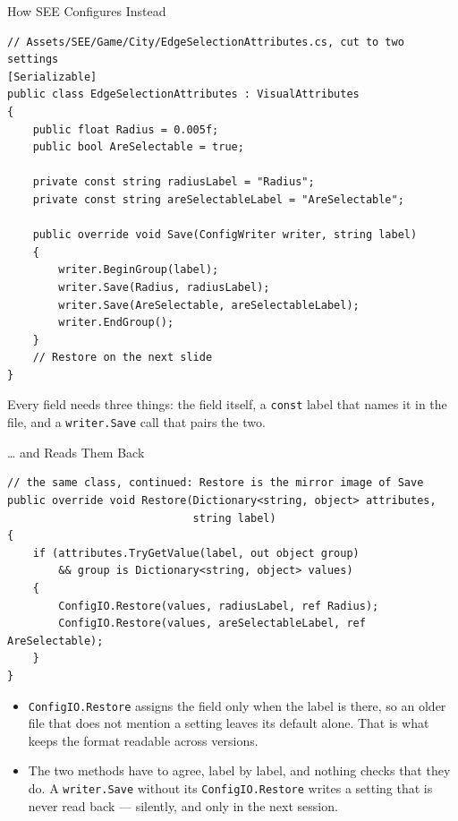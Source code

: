 \begin{frame}[fragile]{How SEE Configures Instead}
  \begin{lstlisting}[basicstyle=\scriptsize\ttfamily]
// Assets/SEE/Game/City/EdgeSelectionAttributes.cs, cut to two settings
[Serializable]
public class EdgeSelectionAttributes : VisualAttributes
{
    public float Radius = 0.005f;
    public bool AreSelectable = true;

    private const string radiusLabel = "Radius";
    private const string areSelectableLabel = "AreSelectable";

    public override void Save(ConfigWriter writer, string label)
    {
        writer.BeginGroup(label);
        writer.Save(Radius, radiusLabel);
        writer.Save(AreSelectable, areSelectableLabel);
        writer.EndGroup();
    }
    // Restore on the next slide
}
  \end{lstlisting}
  \vspace{0.5ex}

  Every field needs three things: the field itself, a \texttt{const} label that
  names it in the file, and a \texttt{writer.Save} call that pairs the two.
\end{frame}

\begin{frame}[fragile]{\ldots{} and Reads Them Back}
  \begin{lstlisting}[basicstyle=\scriptsize\ttfamily]
// the same class, continued: Restore is the mirror image of Save
public override void Restore(Dictionary<string, object> attributes,
                             string label)
{
    if (attributes.TryGetValue(label, out object group)
        && group is Dictionary<string, object> values)
    {
        ConfigIO.Restore(values, radiusLabel, ref Radius);
        ConfigIO.Restore(values, areSelectableLabel, ref AreSelectable);
    }
}
  \end{lstlisting}
  \vspace{1ex}

  \begin{itemize}
    \item \texttt{ConfigIO.Restore} assigns the field only when the label is
      there, so an older file that does not mention a setting leaves its
      default alone. That is what keeps the format readable across versions.
    \item The two methods have to agree, label by label, and nothing checks
      that they do. A \texttt{writer.Save} without its
      \texttt{ConfigIO.Restore} writes a setting that is never read back ---
      silently, and only in the next session.
  \end{itemize}
\end{frame}

